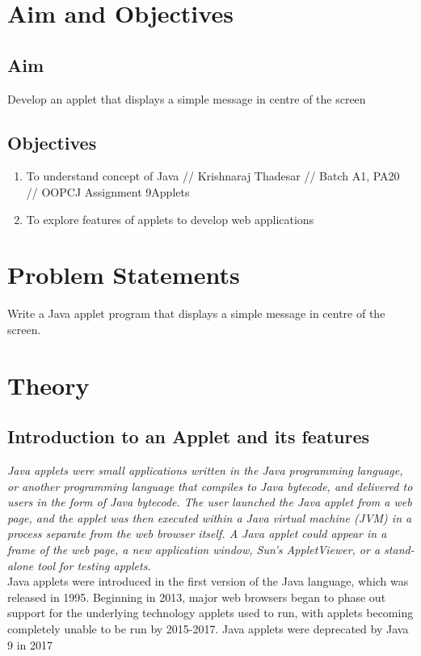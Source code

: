 \documentclass[11pt]{article}
\begin{document}
\tableofcontents
\thispagestyle{empty}
\clearpage


\setcounter{page}{1}

\section{Aim and Objectives}
\subsection*{Aim}
Develop an applet that displays a simple message in centre of the screen
\subsection*{Objectives}
\begin{enumerate}
	\item To understand concept of Java // Krishnaraj Thadesar
	// Batch A1, PA20
	// OOPCJ Assignment 9Applets
	\item To explore features of applets to develop web applications
\end{enumerate}
\section{Problem Statements}
Write a Java applet program that displays a simple message in centre of the screen.

\section{Theory}
\subsection{Introduction to an Applet and its features}
\textit{Java applets were small applications written in the Java programming language, or another programming language that compiles to Java bytecode, and delivered to users in the form of Java bytecode. The user launched the Java applet from a web page, and the applet was then executed within a Java virtual machine (JVM) in a process separate from the web browser itself. A Java applet could appear in a frame of the web page, a new application window, Sun's AppletViewer, or a stand-alone tool for testing applets.}\\

Java applets were introduced in the first version of the Java language, which was released in 1995. Beginning in 2013, major web browsers began to phase out support for the underlying technology applets used to run, with applets becoming completely unable to be run by 2015-2017. Java applets were deprecated by Java 9 in 2017\\
\end{document}
